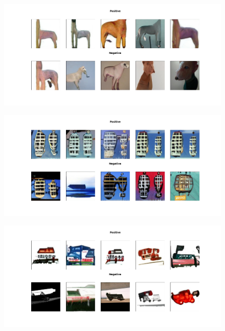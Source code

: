 \documentclass[12pt,a4paper,openany]{book}
\begin{document}
\begin{figure}[ht!]
    \centering
    \includegraphics[scale=0.4]{figs/cifar10_examples/horse.png}
\end{figure}
\begin{figure}[ht!]
    \centering
    \includegraphics[scale=0.4]{figs/cifar10_examples/ship.png}
\end{figure}
\begin{figure}[ht!]
    \centering
    \includegraphics[scale=0.4]{figs/cifar10_examples/truck.png}
\end{figure}
\end{document}
